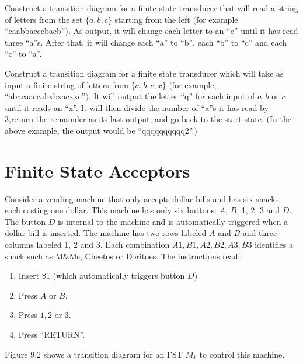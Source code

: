 \begin{prb}
Construct a transition diagram for a finite state transducer that will read a string of letters from the set $\{a,b,c\}$ starting from the left $($for example ``caabbacccbacb''$)$. As output, it will change each letter to an ``e'' until it has read three ``a''s.  After that, it will change each ``a'' to ``b'', each ``b'' to ``c'' and each ``c'' to ``a''.
\end{prb}

\begin{prb}
Construct a transition diagram for a finite state transducer which will take as input a finite string of letters from $\{a,b,c,x\}$ $($for example, ``abacaaccabxbxacxxc''$)$.  It will output the letter ``q'' for each input of  $a, b$ or  $c$ until it reads an ``x''.   It will then divide the number of ``a''s it has read by 3,return the remainder as its last output, and go back to the start state. $($In the above example, the output would be ``qqqqqqqqqq2''.$)$
\end{prb}


\section{Finite State Acceptors}

Consider a vending machine that only accepts dollar bills and has six snacks, each costing one dollar.  This machine has only six buttons:  $A$, $B$, 1, 2, 3 and $D$.   The button $D$ is internal to the machine and is automatically triggered when a dollar bill is inserted. The machine has two rows labeled $A$ and $B$ and three columns labeled 1, 2 and 3.  Each combination $A1, B1, A2, B2, A3, B3$ identifies a snack such as M\&Ms, Cheetos or Doritoes.  The instructions read:

\begin{enumerate}
   \item Insert \$1 (which automatically triggers button $D$)
   \item Press $A$ or $B$.
   \item Press $1, 2$ or $3$.
   \item Press ``RETURN''.
\end{enumerate}

\noindent Figure 9.2 shows a transition diagram for an FST $M_1$ to control this machine.

